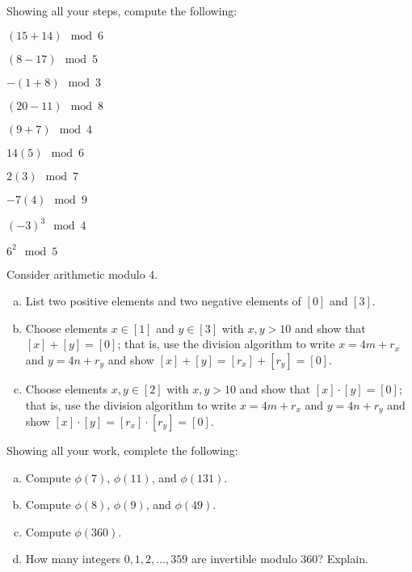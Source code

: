 \documentclass[11pt,letterpaper]{article}
\begin{document}

 Showing all your steps, compute the following:
	\begin{2enumerate}
	\item $(15 + 14) \mod 6$
	\item $(8 - 17) \mod 5$
	\item $-(1 + 8) \mod 3$
	\item $(20 - 11) \mod 8$
	\item $(9 + 7) \mod 4$
	\item $14(5) \mod 6$
	\item $2(3) \mod 7$
	\item $-7(4) \mod 9$
	\item $(-3)^3 \mod 4$
	\item $6^2 \mod 5$
	\end{2enumerate}



\newpage



 Consider arithmetic modulo 4. 
	\begin{enumerate}[(a)]
	\item List two positive elements and two negative elements of $[0]$ and $[3]$. 
	\item Choose elements $x \in [1]$ and $y \in [3]$ with $x, y > 10$ and show that $[x] + [y]= [0]$; that is, use the division algorithm to write $x= 4m + r_x$ and $y= 4n + r_y$ and show $[x] + [y]= [r_x] + [r_y]= [0]$.  
	\item Choose elements $x, y \in [2]$ with $x, y > 10$ and show that $[x] \cdot [y]= [0]$; that is, use the division algorithm to write $x= 4m + r_x$ and $y= 4n + r_y$ and show $[x] \cdot [y]= [r_x] \cdot [r_y]= [0]$. 
	\end{enumerate}



\newpage



 Showing all your work, complete the following: 
	\begin{enumerate}[(a)]
	\item Compute $\phi(7)$, $\phi(11)$, and $\phi(131)$.
	\item Compute $\phi(8)$, $\phi(9)$, and $\phi(49)$. 
	\item Compute $\phi(360)$.
	\item How many integers $0, 1, 2, \ldots, 359$ are invertible modulo 360? Explain. 
	\end{enumerate}
\end{document}
